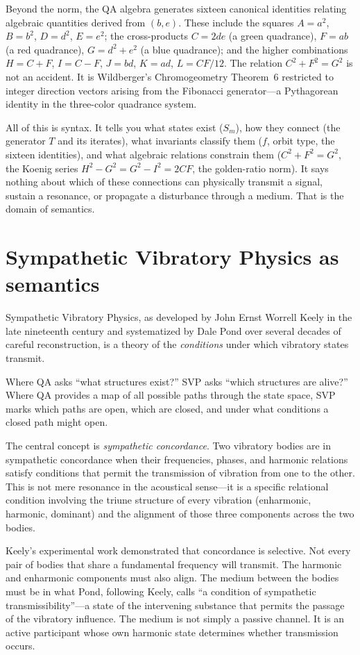 \documentclass[11pt,a4paper]{article}
\begin{document}
Beyond the norm, the QA algebra generates sixteen canonical identities
relating algebraic quantities derived from $(b, e)$. These include the
squares $A = a^2$, $B = b^2$, $D = d^2$, $E = e^2$; the cross-products
$C = 2de$ (a green quadrance), $F = ab$ (a red quadrance),
$G = d^2 + e^2$ (a blue quadrance); and the higher combinations
$H = C + F$, $I = C - F$, $J = bd$, $K = ad$, $L = CF/12$. The
relation $C^2 + F^2 = G^2$ is not an accident. It is Wildberger's
Chromogeometry Theorem~6 restricted to integer direction vectors
arising from the Fibonacci generator---a Pythagorean identity in the
three-color quadrance system.

All of this is syntax. It tells you what states exist
($S_m$), how they connect (the generator $T$ and its iterates), what
invariants classify them ($f$, orbit type, the sixteen identities), and
what algebraic relations constrain them ($C^2 + F^2 = G^2$, the Koenig
series $H^2 - G^2 = G^2 - I^2 = 2CF$, the golden-ratio norm). It says
nothing about which of these connections can physically transmit a signal,
sustain a resonance, or propagate a disturbance through a medium. That is
the domain of semantics.

\section{Sympathetic Vibratory Physics as semantics}

Sympathetic Vibratory Physics, as developed by John Ernst Worrell Keely
in the late nineteenth century and systematized by Dale Pond over several
decades of careful reconstruction, is a theory of the \emph{conditions}
under which vibratory states transmit.

Where QA asks ``what structures exist?'' SVP asks ``which structures are
alive?'' Where QA provides a map of all possible paths through the state
space, SVP marks which paths are open, which are closed, and under what
conditions a closed path might open.

The central concept is \emph{sympathetic concordance}. Two vibratory
bodies are in sympathetic concordance when their frequencies, phases, and
harmonic relations satisfy conditions that permit the transmission of
vibration from one to the other. This is not mere resonance in the
acoustical sense---it is a specific relational condition involving the
triune structure of every vibration (enharmonic, harmonic, dominant) and
the alignment of those three components across the two bodies.

Keely's experimental work demonstrated that concordance is selective.
Not every pair of bodies that share a fundamental frequency will
transmit. The harmonic and enharmonic components must also align. The
medium between the bodies must be in what Pond, following Keely, calls
``a condition of sympathetic transmissibility''---a state of the
intervening substance that permits the passage of the vibratory
influence. The medium is not simply a passive channel. It is an active
participant whose own harmonic state determines whether transmission
occurs.
\end{document}
